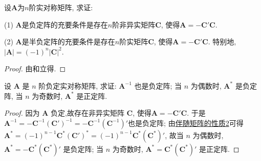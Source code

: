 \documentclass[../../main.tex]{subfiles}
\begin{document}
\begin{proposition}
设$\boldsymbol{A}$为$n$阶实对称矩阵, 求证:

(1) $\boldsymbol{A}$是负定阵的充要条件是存在$n$阶非异实矩阵$\boldsymbol{C}$, 使得$\boldsymbol{A}=-\boldsymbol{C}'\boldsymbol{C}$.

(2) $\boldsymbol{A}$是半负定阵的充要条件是存在$n$阶实矩阵$\boldsymbol{C}$, 使得$\boldsymbol{A}=-\boldsymbol{C}'\boldsymbol{C}$. 特别地, $|\boldsymbol{A}| = (-1)^n|\boldsymbol{C}|^2$.
\end{proposition}
\begin{proof}
由和立得.
\end{proof}

\begin{proposition}\label{proposition:负定阵的相关性质}
设 \(\boldsymbol{A}\) 是 \(n\) 阶负定实对称矩阵, 求证: \(\boldsymbol{A}^{-1}\) 也是负定阵; 当 \(n\) 为偶数时, \(\boldsymbol{A}^*\) 是负定阵, 当 \(n\) 为奇数时, \(\boldsymbol{A}^*\) 是正定阵.
\end{proposition}
\begin{proof}
因为 \(\boldsymbol{A}\) 负定,故存在非异实矩阵 \(\boldsymbol{C}\), 使得\(\boldsymbol{A}=-\boldsymbol{C}'\boldsymbol{C}\). 于是 \(\boldsymbol{A}^{-1}=-\boldsymbol{C}^{-1}(\boldsymbol{C}')^{-1}=-\boldsymbol{C}^{-1}(\boldsymbol{C}^{-1})'\)也是负定阵; 由\hyperref[proposition:伴随矩阵的性质]{伴随矩阵的性质2}可得 \(\boldsymbol{A}^*=(-1)^{n - 1}\boldsymbol{C}^*(\boldsymbol{C}')^*=(-1)^{n - 1}\boldsymbol{C}^*(\boldsymbol{C}^*)'\), 故当 \(n\) 为偶数时, \(\boldsymbol{A}^*=-\boldsymbol{C}^*(\boldsymbol{C}^*)'\) 是负定阵; 当 \(n\) 为奇数时, \(\boldsymbol{A}^*=\boldsymbol{C}^*(\boldsymbol{C}^*)'\) 是正定阵.
\end{proof}
\end{document}
